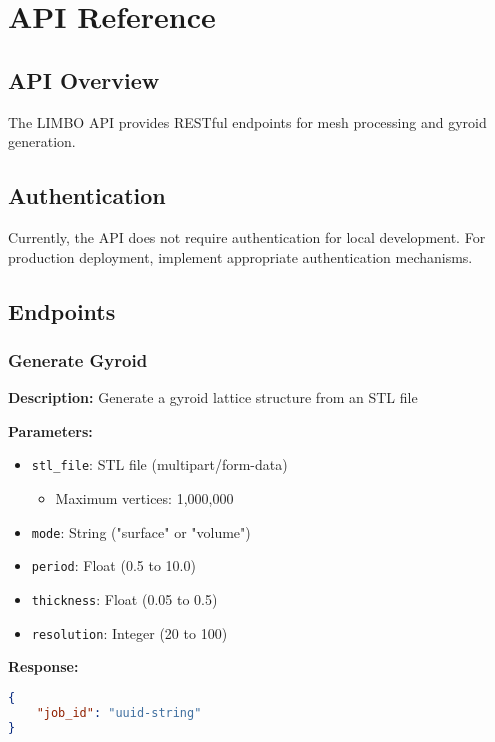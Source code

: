 \chapter{API Reference}

\section{API Overview}
The LIMBO API provides RESTful endpoints for mesh processing and gyroid generation.

\section{Authentication}
Currently, the API does not require authentication for local development. For production deployment, implement appropriate authentication mechanisms.

\section{Endpoints}
\subsection{Generate Gyroid}
\begin{tcolorbox}[title=POST /generate\_gyroid]
\textbf{Description:} Generate a gyroid lattice structure from an STL file

\textbf{Parameters:}
\begin{itemize}
    \item \texttt{stl\_file}: STL file (multipart/form-data)
    \begin{itemize}
        \item Maximum vertices: 1,000,000
    \end{itemize}
    \item \texttt{mode}: String ("surface" or "volume")
    \item \texttt{period}: Float (0.5 to 10.0)
    \item \texttt{thickness}: Float (0.05 to 0.5)
    \item \texttt{resolution}: Integer (20 to 100)
\end{itemize}

\textbf{Response:}
\begin{lstlisting}[language=json]
{
    "job_id": "uuid-string"
}
\end{lstlisting}
\end{tcolorbox}

